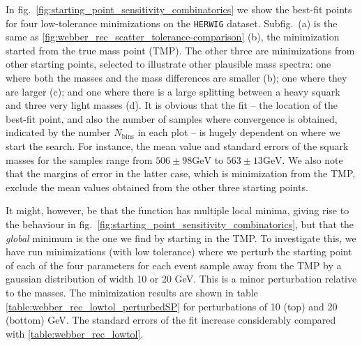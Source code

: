 \documentclass[twoside,english]{uiofysmaster}
\begin{document}
In fig.\ \ref{fig:starting_point_sensitivity_combinatorics} we show the best-fit points for four low-tolerance minimizations on the {\tt HERWIG} dataset. Subfig.\ (a) is the same as \ref{fig:webber_rec_scatter_tolerance-comparison} (b), the minimization started from the true mass point (TMP). The other three are minimizations from other starting points, selected to illustrate other plausible mass spectra: one where both the masses and the mass differences are smaller (b); one where they are larger (c); and one where there is a large splitting between a heavy squark and three very light masses (d). It is obvious that the fit -- the location of the best-fit point, and also the number of samples where convergence is obtained, indicated by the number $N_\mathrm{bins}$ in each plot -- is hugely dependent on where we start the search. For instance, the mean value and standard errors of the squark masses for the samples range from $506 \pm 98 \mathrm{GeV}$ to $563 \pm 13 \mathrm{GeV}$. We also note that the margins of error in the latter case, which is minimization from the TMP, exclude the mean values obtained from the other three starting points.



It might, however, be that the function has multiple local minima, giving rise to the behaviour in fig.\ \ref{fig:starting_point_sensitivity_combinatorics}, but that the {\it global} minimum is the one we find by starting in the TMP. To investigate this, we have run minimizations (with low tolerance) where we perturb the starting point of each of the four parameters for each event sample away from the TMP by a gaussian distribution of width 10 or 20 GeV. This is a minor perturbation relative to the masses. The minimization results are shown in table \ref{table:webber_rec_lowtol_perturbedSP} for perturbations of 10 (top) and 20 (bottom) GeV. The standard errors of the fit increase considerably compared with \ref{table:webber_rec_lowtol}. 
 
\end{document}
